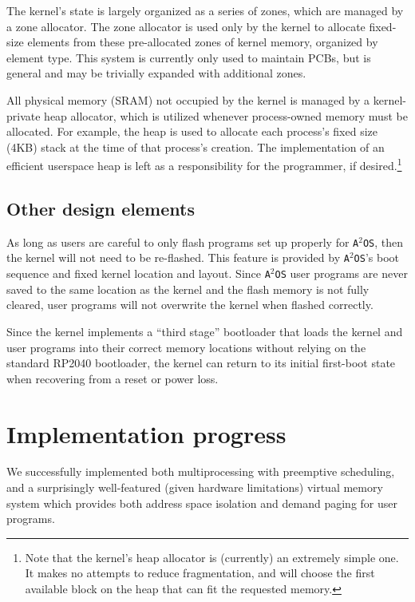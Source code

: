\documentclass[12pt]{article}
\newcommand{\os}{\texttt{A$^2$OS} }
\newcommand{\osns}{\texttt{A$^2$OS}}
\begin{document}
The kernel's state is largely organized as a series of zones, which are managed
by a zone allocator. The zone allocator is used only by the kernel to allocate
fixed-size elements from these pre-allocated zones of kernel memory, organized
by element type. This system is currently only used to maintain PCBs, but is
general and may be trivially expanded with additional zones.

All physical memory (SRAM) not occupied by the kernel is managed by a
kernel-private heap allocator, which is utilized whenever process-owned memory
must be allocated. For example, the heap is used to allocate each process's
fixed size (4KB) stack at the time of that process's creation. The
implementation of an efficient userspace heap is left as a responsibility for
the programmer, if desired.\footnote{Note
that the kernel's heap allocator is (currently) an extremely simple one. It
makes no attempts to reduce fragmentation, and will choose the first available
block on the heap that can fit the requested memory.}

\subsection{Other design elements}
As long as users are careful to only flash programs set up properly for \osns,
then the kernel will not need to be re-flashed. This feature is provided by
\osns's boot sequence and fixed kernel location and layout. Since \os user
programs are never saved to the same location as the kernel and the flash memory
is not fully cleared, user programs will not overwrite the kernel when flashed
correctly.

Since the kernel implements a ``third stage'' bootloader that loads the kernel
and user programs into their correct memory locations without relying on the
standard RP2040 bootloader, the kernel can return to its initial first-boot
state when recovering from a reset or power loss.

\section{Implementation progress}

We successfully implemented both multiprocessing with preemptive scheduling, and
a surprisingly well-featured (given hardware limitations) virtual memory system
which provides both address space isolation and demand paging for user programs.
\end{document}
